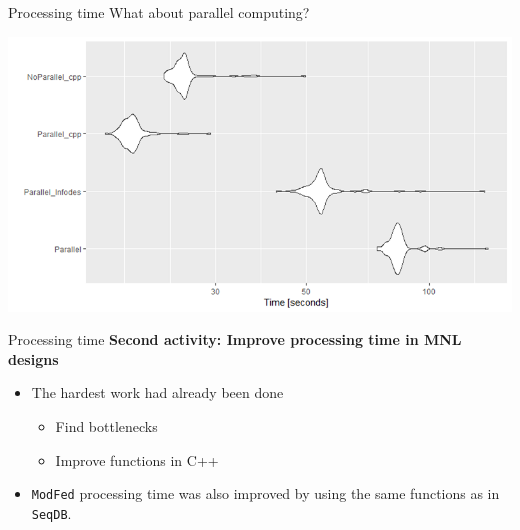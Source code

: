 \documentclass[11pt,t]{beamer}
\begin{document}
\begin{frame}[fragile]{Processing time}
	What about parallel computing?
	\vspace*{-3mm}
	\begin{center}
		\includegraphics[scale = .4]{mygraphics/benchmark3.png}
	\end{center}
\end{frame}

\begin{frame}[fragile]{Processing time}
	\textbf{Second activity: Improve processing time in MNL designs}	
	\begin{itemize}
		\item The hardest work had already been done
		\begin{itemize}
			\item Find bottlenecks
			\item Improve functions in C++
		\end{itemize}
		\item \texttt{ModFed} processing time was also improved by using the same functions as in \texttt{SeqDB}.
	\end{itemize}
\end{frame}
\end{document}
